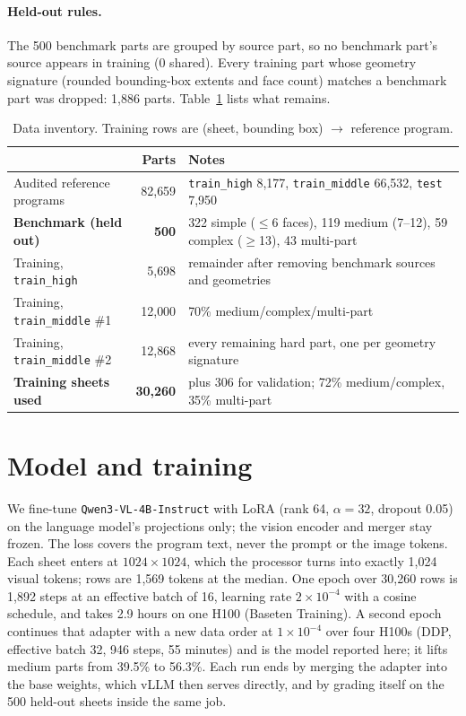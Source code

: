 \documentclass[11pt]{article}
\begin{document}
\paragraph{Held-out rules.} The 500 benchmark parts are grouped by source part, so no benchmark part's source appears
in training (0 shared). Every training part whose geometry signature (rounded bounding-box extents and face count)
matches a benchmark part was dropped: 1{,}886 parts. Table~\ref{tab:data} lists what remains.

\begin{table}[h]
\centering\small
\begin{tabular}{lrl}
\toprule
& Parts & Notes \\
\midrule
Audited reference programs & 82{,}659 & \texttt{train\_high} 8{,}177, \texttt{train\_middle} 66{,}532, \texttt{test} 7{,}950 \\
\textbf{Benchmark (held out)} & \textbf{500} & 322 simple ($\le$6 faces), 119 medium (7--12), 59 complex ($\ge$13), 43 multi-part \\
Training, \texttt{train\_high} & 5{,}698 & remainder after removing benchmark sources and geometries \\
Training, \texttt{train\_middle} \#1 & 12{,}000 & 70\% medium/complex/multi-part \\
Training, \texttt{train\_middle} \#2 & 12{,}868 & every remaining hard part, one per geometry signature \\
\textbf{Training sheets used} & \textbf{30{,}260} & plus 306 for validation; 72\% medium/complex, 35\% multi-part \\
\bottomrule
\end{tabular}
\caption{Data inventory. Training rows are (sheet, bounding box) $\rightarrow$ reference program.}
\label{tab:data}
\end{table}

\section{Model and training}

We fine-tune \texttt{Qwen3-VL-4B-Instruct} with LoRA (rank 64, $\alpha=32$, dropout 0.05) on the language model's
projections only; the vision encoder and merger stay frozen. The loss covers the program text, never the prompt or
the image tokens. Each sheet enters at $1024\times1024$, which the processor turns into exactly 1{,}024 visual
tokens; rows are 1{,}569 tokens at the median. One epoch over 30{,}260 rows is 1{,}892 steps at an effective batch of
16, learning rate $2\times10^{-4}$ with a cosine schedule, and takes 2.9 hours on one H100 (Baseten Training). A
second epoch continues that adapter with a new data order at $1\times10^{-4}$ over four H100s (DDP, effective batch
32, 946 steps, 55 minutes) and is the model reported here; it lifts medium parts from 39.5\% to 56.3\%. Each run
ends by merging the adapter into the base weights, which vLLM then serves directly, and by grading itself on the 500
held-out sheets inside the same job.
\end{document}
